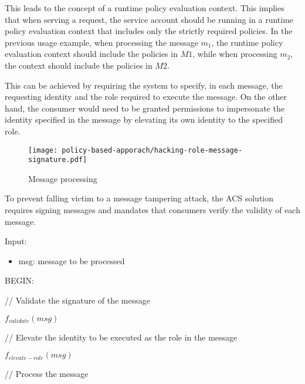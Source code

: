 \vspace{15pt}

This leads to the concept of a runtime policy evaluation context. This implies that when serving a request, the service account should be running in a runtime policy evaluation context that includes only the strictly required policies. 
In the previous usage example, when processing the message $m_1$, the runtime policy evaluation context should include the policies in $M1$, while when processing $m_2$, the context should include the policies in $M2$.

This can be achieved by requiring the system to specify, in each message, the requesting identity and the role required to execute the message. On the other hand, the consumer would need to be granted permissions to impersonate the identity specified in the message by elevating its own identity to the specified role.

\begin{figure}[h]
    \centering
    \texttt{[image: policy-based-apporach/hacking-role-message-signature.pdf]}
    \caption{Message processing}
    \label{fig:hacking-role-message-signature}
\end{figure}

To prevent falling victim to a message tampering attack, the ACS solution requires signing messages and mandates that consumers verify the validity of each message.

\begin{boxF}
    \begin{definition}
        Input:
        \begin{itemize}
            \item msg: message to be processed
        \end{itemize}

        BEGIN:

            \hspace{2pt} // Validate the signature of the message

            \hspace{2pt} $f_{validate}(msg)$

            \hspace{2pt} // Elevate the identity to be executed as the role in the message

            \hspace{2pt} $f_{elevate-role}(msg)$

            \hspace{2pt} // Process the message
        \label{definition:message-processing}
    \end{definition}
\end{boxF}

